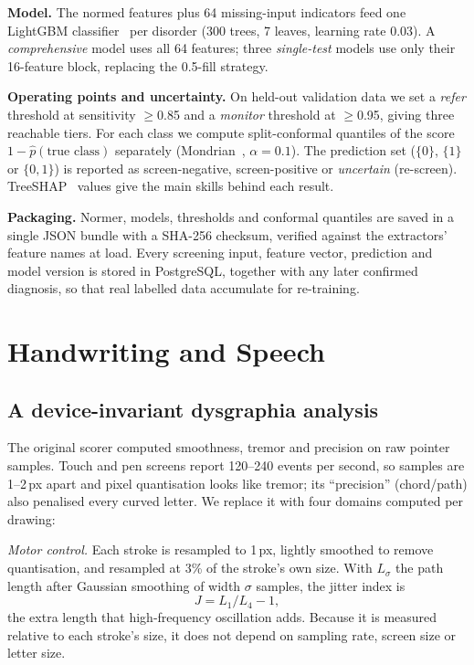 \documentclass[conference]{IEEEtran}
\begin{document}
\textbf{Model.} The normed features plus 64 missing-input indicators feed one
LightGBM classifier~\cite{ke2017} per disorder (300 trees, 7 leaves, learning rate
0.03). A \emph{comprehensive} model uses all 64 features; three \emph{single-test}
models use only their 16-feature block, replacing the 0.5-fill strategy.

\textbf{Operating points and uncertainty.} On held-out validation data we set a
\emph{refer} threshold at sensitivity $\geq$0.85 and a \emph{monitor} threshold at
$\geq$0.95, giving three reachable tiers. For each class we compute split-conformal
quantiles of the score $1-\hat p(\text{true class})$ separately
(Mondrian~\cite{vovk2005}, $\alpha{=}0.1$). The prediction set
($\{0\}$, $\{1\}$ or $\{0,1\}$) is reported as screen-negative, screen-positive or
\emph{uncertain} (re-screen). TreeSHAP~\cite{lundberg2020} values give the main
skills behind each result.

\textbf{Packaging.} Normer, models, thresholds and conformal quantiles are saved in a
single JSON bundle with a SHA-256 checksum, verified against the extractors' feature
names at load. Every screening input, feature vector, prediction and model version is
stored in PostgreSQL, together with any later confirmed diagnosis, so that real
labelled data accumulate for re-training.

\section{Handwriting and Speech}\label{sec:handwriting}
\subsection{A device-invariant dysgraphia analysis}
The original scorer computed smoothness, tremor and precision on raw pointer
samples. Touch and pen screens report 120--240 events per second, so samples are
1--2\,px apart and pixel quantisation looks like tremor; its ``precision''
(chord/path) also penalised every curved letter. We replace it with four domains
computed per drawing:

\emph{Motor control.} Each stroke is resampled to 1\,px, lightly smoothed to remove
quantisation, and resampled at 3\% of the stroke's own size. With $L_\sigma$ the
path length after Gaussian smoothing of width $\sigma$ samples, the jitter index is
\begin{equation}
J = L_{1}/L_{4} - 1 ,
\end{equation}
the extra length that high-frequency oscillation adds. Because it is measured relative
to each stroke's size, it does not depend on sampling rate, screen size or letter size.
\end{document}
